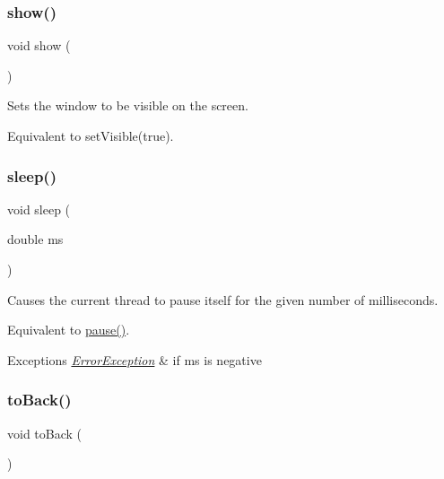 \mbox{\label{classGWindow_a4b148f40a95444d5669406b918ad2f52}} 
\subsubsection{\texorpdfstring{show()}{show()}}
{\footnotesize\ttfamily void show (\begin{DoxyParamCaption}{ }\end{DoxyParamCaption})\hspace{0.3cm}{\ttfamily [virtual]}}



Sets the window to be visible on the screen. 

Equivalent to set\+Visible(true). \mbox{\label{classGWindow_aa3381590c1ef33c08000c2fbb2bf0dd0}} 
\subsubsection{\texorpdfstring{sleep()}{sleep()}}
{\footnotesize\ttfamily void sleep (\begin{DoxyParamCaption}\item[{double}]{ms }\end{DoxyParamCaption})\hspace{0.3cm}{\ttfamily [virtual]}}



Causes the current thread to pause itself for the given number of milliseconds. 

Equivalent to \mbox{\hyperlink{classGWindow_adc7d99bb2dc43b8337e89b7d54cab9d3}{pause()}}. 
\begin{DoxyExceptions}{Exceptions}
{\em \mbox{\hyperlink{classErrorException}{Error\+Exception}}} & if ms is negative \\
\hline
\end{DoxyExceptions}
\mbox{\label{classGWindow_a6053c984b166df7d3db5ee4c4ad65b99}} 
\subsubsection{\texorpdfstring{to\+Back()}{toBack()}}
{\footnotesize\ttfamily void to\+Back (\begin{DoxyParamCaption}{ }\end{DoxyParamCaption})\hspace{0.3cm}{\ttfamily [virtual]}}



